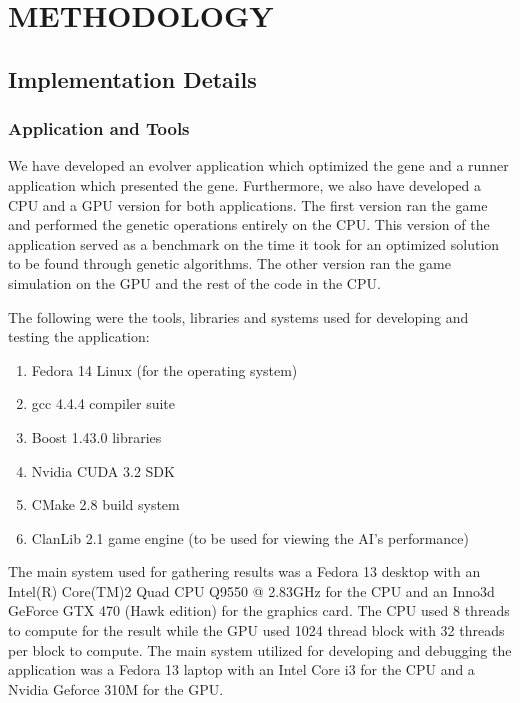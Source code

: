 \chapter{METHODOLOGY}
%
%
\section{Implementation Details}

\subsection{Application and Tools}
We have developed an evolver application which optimized the gene and a runner
application which presented the gene. Furthermore, we also have developed a CPU and
a GPU version for both applications. The first version ran the game and performed 
the genetic operations entirely on the CPU. This version of the application served 
as a benchmark on the time it took for an optimized solution to be found through 
genetic algorithms. The other version ran the game simulation on the GPU and 
the rest of the code in the CPU.


The following were the tools, libraries and systems used for developing and testing
the application:

\begin{enumerate}
  \item Fedora 14 Linux (for the operating system)
  \item gcc 4.4.4 compiler suite
  \item Boost 1.43.0 libraries
  \item Nvidia CUDA 3.2 SDK
  \item CMake 2.8 build system
  \item ClanLib 2.1 game engine (to be used for viewing the AI's performance)
\end{enumerate}

The main system used for gathering results was a Fedora 13 desktop with an 
Intel(R) Core(TM)2 Quad CPU Q9550 @ 2.83GHz for the CPU and an 
Inno3d GeForce GTX 470 (Hawk edition) for the graphics card. The CPU used 8
threads to compute for the result while the GPU used 1024 thread block with
32 threads per block to compute. The main system utilized for developing and 
debugging the application was a Fedora 13 laptop with an Intel Core i3 for 
the CPU and a Nvidia Geforce 310M for the GPU.


